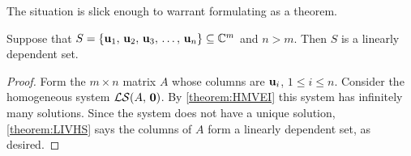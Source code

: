 \documentclass{ximera}
\begin{document}
The situation is slick enough to warrant formulating as a theorem.

\begin{theorem}
\label{theorem:MVSLD}

Suppose that $S=\left\{\mathbf{u}_{1},\,\mathbf{u}_{2},\,\mathbf{u}_{3},\,\ldots,\,\mathbf{u}_{n}\right\}\subseteq\mathbb{C}^{m}$ and
$n>m$. Then $S$ is a linearly dependent set.

\begin{proof}
  Form the $m\times n$ matrix $A$ whose columns are $\mathbf{u}_i$,
  $1\leq i\leq n$.  Consider the homogeneous system $\mathcal{LS}\!\left(A,\,\mathbf{0}\right)$.
  By \ref{theorem:HMVEI} this system has infinitely many solutions.
  Since the system does not have a unique solution,
  \ref{theorem:LIVHS} says the columns of $A$ form a linearly
  dependent set, as desired.
\end{proof}
\end{theorem}
\end{document}
